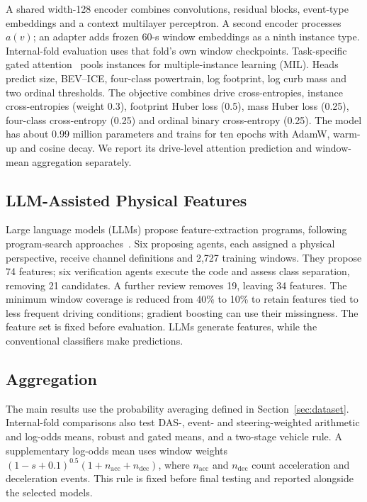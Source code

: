 A shared width-128 encoder combines convolutions, residual blocks, event-type embeddings and a context multilayer perceptron. A second encoder processes $a(v)$; an adapter adds frozen 60-s window embeddings as a ninth instance type. Internal-fold evaluation uses that fold's own window checkpoints. Task-specific gated attention~\cite{ilse2018mil} pools instances for multiple-instance learning (MIL). Heads predict size, BEV--ICE, four-class powertrain, log footprint, log curb mass and two ordinal thresholds. The objective combines drive cross-entropies, instance cross-entropies (weight 0.3), footprint Huber loss (0.5), mass Huber loss (0.25), four-class cross-entropy (0.25) and ordinal binary cross-entropy (0.25). The model has about 0.99 million parameters and trains for ten epochs with AdamW, warm-up and cosine decay. We report its drive-level attention prediction and window-mean aggregation separately.

\subsection{LLM-Assisted Physical Features}
Large language models (LLMs) propose feature-extraction programs, following program-search approaches~\cite{romeraparedes2024funsearch}. Six proposing agents, each assigned a physical perspective, receive channel definitions and 2,727 training windows. They propose 74 features; six verification agents execute the code and assess class separation, removing 21 candidates. A further review removes 19, leaving 34 features. The minimum window coverage is reduced from 40\% to 10\% to retain features tied to less frequent driving conditions; gradient boosting can use their missingness. The feature set is fixed before evaluation. LLMs generate features, while the conventional classifiers make predictions.

\subsection{Aggregation}
The main results use the probability averaging defined in Section~\ref{sec:dataset}. Internal-fold comparisons also test DAS-, event- and steering-weighted arithmetic and log-odds means, robust and gated means, and a two-stage vehicle rule. A supplementary log-odds mean uses window weights $(1-s+0.1)^{0.5}(1+n_{\mathrm{acc}}+n_{\mathrm{dec}})$, where $n_{\mathrm{acc}}$ and $n_{\mathrm{dec}}$ count acceleration and deceleration events. This rule is fixed before final testing and reported alongside the selected models.
